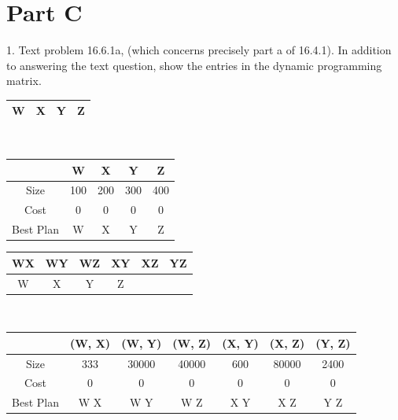 \documentclass[12pt, letterpaper, fleqn]{article}
\def\fullouterjoin{\mathbin{\ojoin\mkern0mu\bowtie\mkern3mu\ojoin}}
\begin{document}
  \section{Part C}
  1. Text problem 16.6.1a, (which concerns precisely part a of 16.4.1). In
  addition to answering the text question, show the entries in the dynamic
  programming matrix. \\
  
  \begin{center}
  \begin{tabular} {| c | c | c | c |}
  \hline
  W & X & Y & Z\\
  \hline
  \end{tabular} \\
  \begin{tabular} { c | c | c | c | c }
  & W & X & Y & Z \\
  \hline
  Size & 100  & 200  & 300 & 400\\
  Cost & 0    & 0    & 0   & 0 \\
  Best Plan & W & X & Y & Z \\
  \end{tabular}
  \end{center}
  

  \begin{center}
  \begin{tabular} {| c | c | c | c | c | c |}
  \hline
  WX & WY & WZ & XY & XZ & YZ \\
  \hline
  W & X & Y & Z & & \\
  \hline
  \end{tabular} \\
  \begin{tabular} { c | c | c | c | c | c | c }
  & (W, X) & (W, Y) & (W, Z) & (X, Y) & (X, Z) & (Y, Z) \\
  \hline
  Size & 333 & 30000 & 40000 & 600 & 80000 & 2400 \\
  Cost & 0 & 0 & 0 & 0 & 0 & 0\\
  Best Plan & W \fullouterjoin X & W \fullouterjoin Y & W \fullouterjoin Z & X
  \fullouterjoin Y & X \fullouterjoin Z & Y \fullouterjoin Z \\
  \end{tabular}
  \end{center}
\end{document}

